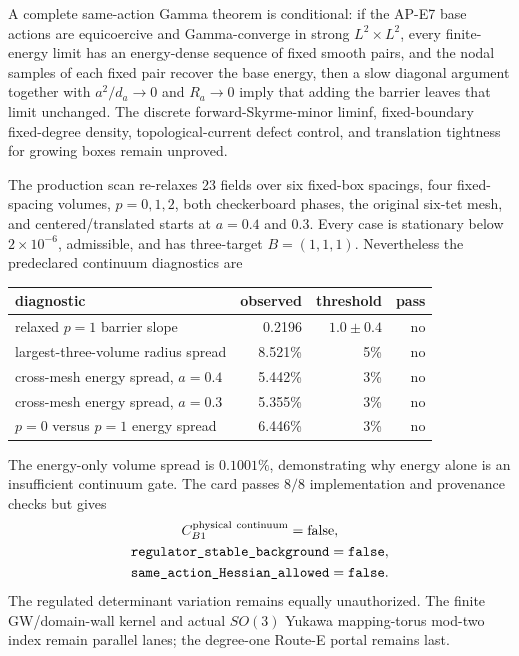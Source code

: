 \documentclass[11pt]{article}
\numberwithin{equation}{section}
\begin{document}
A complete same-action Gamma theorem is conditional: if the AP-E7 base
actions are equicoercive and Gamma-converge in strong $L^2\times L^2$, every
finite-energy limit has an energy-dense sequence of fixed smooth pairs, and
the nodal samples of each fixed pair recover the base energy, then a slow
diagonal argument together with
$a^2/d_a\to0$ and $R_a\to0$ imply that adding the barrier leaves that limit
unchanged.  The discrete forward-Skyrme-minor liminf, fixed-boundary
fixed-degree density, topological-current defect control, and translation
tightness for growing boxes remain unproved.

The production scan re-relaxes 23 fields over six fixed-box spacings, four
fixed-spacing volumes, $p=0,1,2$, both checkerboard phases, the original
six-tet mesh, and centered/translated starts at $a=0.4$ and $0.3$.  Every
case is stationary below $2\times10^{-6}$, admissible, and has three-target
$B=(1,1,1)$.  Nevertheless the predeclared continuum diagnostics are
\begin{center}
\begin{tabular}{lrrr}
\toprule
diagnostic&observed&threshold&pass\\
\midrule
relaxed $p=1$ barrier slope&0.2196&$1.0\pm0.4$&no\\
largest-three-volume radius spread&8.521\%&5\%&no\\
cross-mesh energy spread, $a=0.4$&5.442\%&3\%&no\\
cross-mesh energy spread, $a=0.3$&5.355\%&3\%&no\\
$p=0$ versus $p=1$ energy spread&6.446\%&3\%&no\\
\bottomrule
\end{tabular}
\end{center}
The energy-only volume spread is $0.1001\%$, demonstrating why energy alone
is an insufficient continuum gate.  The card passes $8/8$ implementation
and provenance checks but gives
\begin{equation}
 \begin{gathered}
 C_{B1}^{\rm physical\ continuum}=\mathrm{false},\\
 \texttt{regulator\_stable\_background}=\texttt{false},\\
 \texttt{same\_action\_Hessian\_allowed}=\texttt{false}.
 \end{gathered}
 \label{eq:e9-decision}
\end{equation}
The regulated determinant variation remains equally unauthorized.  The
finite GW/domain-wall kernel and actual $SO(3)$ Yukawa mapping-torus mod-two
index remain parallel lanes; the degree-one Route-E portal remains last.
\end{document}

